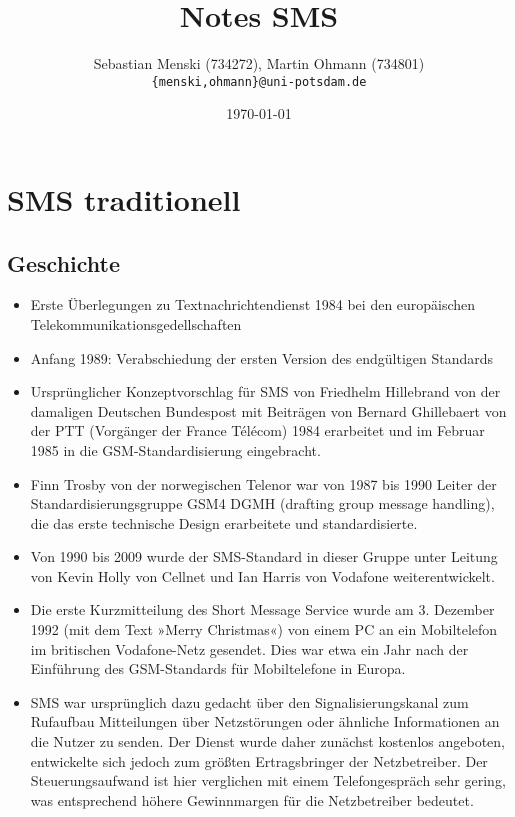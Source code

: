 \documentclass[german,12pt,a4paper]{article}
\begin{document}
\title{\textbf{Notes SMS}}
\author{Sebastian Menski (734272), Martin Ohmann (734801) \\ \texttt{\{menski,ohmann\}@uni-potsdam.de}}
\date{\today}

\maketitle

\section{SMS traditionell}
\subsection{Geschichte}
\begin{itemize}
	\item Erste Überlegungen zu Textnachrichtendienst 1984 bei den europäischen 
		Telekommunikationsgedellschaften
	\item Anfang 1989: Verabschiedung der ersten Version des endgültigen Standards
	\item Ursprünglicher Konzeptvorschlag für SMS von  Friedhelm Hillebrand von 
		der damaligen Deutschen Bundespost mit Beiträgen von Bernard Ghillebaert von der 
		PTT (Vorgänger der France Télécom) 1984 erarbeitet und im Februar 1985 
		in die GSM-Standardisierung eingebracht.
	\item Finn Trosby von der norwegischen Telenor war von 1987 bis 1990 Leiter 
		der Standardisierungsgruppe GSM4 DGMH (drafting group message handling), 
		die das erste technische Design erarbeitete und standardisierte.
	\item Von 1990 bis 2009 wurde der SMS-Standard in dieser Gruppe unter Leitung 
		von Kevin Holly von Cellnet und Ian Harris von Vodafone weiterentwickelt.
	\item Die erste Kurzmitteilung des Short Message Service wurde am 3. Dezember 1992 
		(mit dem Text »Merry Christmas«) von einem PC an ein Mobiltelefon im 
		britischen Vodafone-Netz gesendet. Dies war etwa ein Jahr nach der Einführung 
		des GSM-Standards für Mobiltelefone in Europa.
	\item SMS war ursprünglich dazu gedacht über den Signalisierungskanal zum Rufaufbau 
		Mitteilungen über Netzstörungen oder ähnliche Informationen an die Nutzer zu senden. Der 
		Dienst wurde daher zunächst kostenlos angeboten, entwickelte sich jedoch zum größten 
		Ertragsbringer der Netzbetreiber. Der Steuerungsaufwand ist hier verglichen mit einem Telefongespräch
		sehr gering, was entsprechend höhere Gewinnmargen für die Netzbetreiber bedeutet.
\end{itemize}
	
\end{document}
